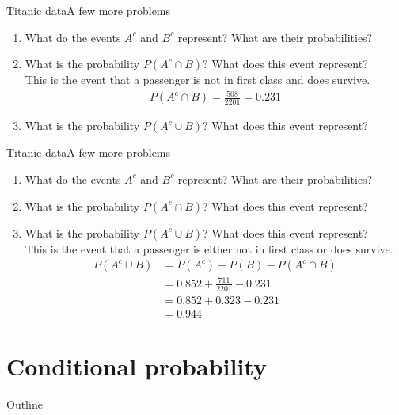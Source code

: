 \documentclass[xcolor=dvipsnames]{beamer}
\begin{document}
\begin{frame}{Titanic data}{A few more problems}
\begin{enumerate}
	\item What do the events $A^c$ and $B^c$ represent? What are their probabilities?
	\item What is the probability $P(A^c \cap B)$? What does this event represent? \\
	This is the event that a passenger is not in first class and does survive.
	\begin{gather*}
		P(A^c \cap B) = \frac{508}{2201} = 0.231
	\end{gather*}
	\item What is the probability $P(A^c \cup B)$? What does this event represent?
\end{enumerate}
\end{frame}

\begin{frame}{Titanic data}{A few more problems}
\begin{enumerate}
	\item What do the events $A^c$ and $B^c$ represent? What are their probabilities?
	\item What is the probability $P(A^c \cap B)$? What does this event represent? 
	\item What is the probability $P(A^c \cup B)$? What does this event represent? \\
	This is the event that a passenger is either not in first class or does survive.
	\begin{align*}
		P(A^c \cup B) &= P(A^c) + P(B) - P(A^c \cap B)\\ 
		&= 0.852 + \frac{711}{2201} - 0.231 \\
		&= 0.852 + 0.323 - 0.231 \\
		&= 0.944
	\end{align*}
\end{enumerate}
\end{frame}

\section{Conditional probability}
\begin{frame}{Outline}
\tableofcontents[currentsection,subsectionstyle=show/shaded/hide]
\end{frame}
\end{document}
